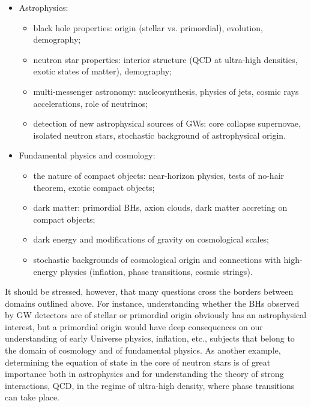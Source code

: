 \begin{itemize}
\item Astrophysics:
  \begin{itemize}
   \item black hole properties: origin (stellar vs. primordial), evolution, demography;
   \item neutron star properties: interior structure (QCD at ultra-high densities, exotic states of matter), demography;
   \item multi-messenger astronomy: nucleosynthesis, physics of jets, cosmic rays accelerations, role of neutrinos;
   \item detection of new astrophysical sources of GWs: core collapse supernovae, isolated neutron stars, stochastic background of astrophysical origin.
  \end{itemize}
\item Fundamental physics and cosmology:
  \begin{itemize}
   \item the nature of compact objects: near-horizon physics, tests of no-hair theorem, exotic compact objects;
  \item dark matter: primordial BHs, axion clouds, dark matter accreting on compact objects;
  \item dark energy and modifications of  gravity on cosmological scales;
   \item stochastic backgrounds of cosmological origin and connections with high-energy physics (inflation, phase transitions, cosmic strings).
  \end{itemize}
\end{itemize}

It should  be stressed, however, that many questions cross the borders between  domains outlined above. For instance, understanding whether the BHs observed by GW detectors are of stellar or primordial origin obviously has an astrophysical interest, but a primordial origin would have deep consequences on  our understanding of early Universe physics, inflation, etc., subjects that belong to the domain of cosmology and of fundamental physics. As another example, determining the equation of state in the core of neutron stars is of great importance both in astrophysics and for understanding the theory of strong interactions, QCD, in the regime of ultra-high  density, where phase transitions can take place.
 
